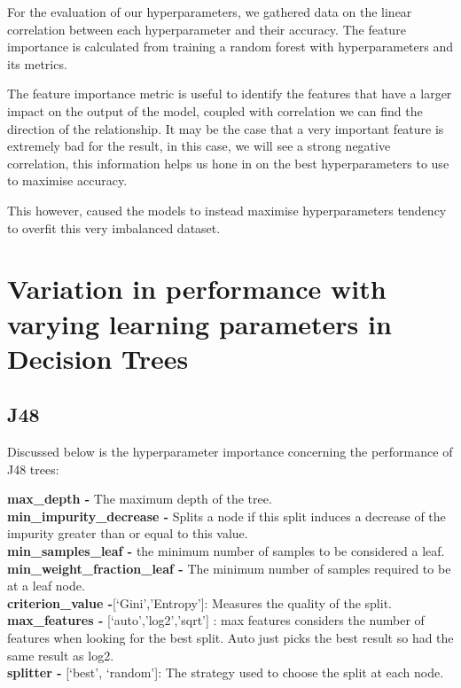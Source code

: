 \documentclass[11pt]{article}
\begin{document}
For the evaluation of our hyperparameters, we gathered data on the linear correlation between each hyperparameter and their accuracy. The feature importance is calculated from training a random forest with hyperparameters and its metrics. \cite{ParameterImportance}
\par
The feature importance metric is useful to identify the features that have a larger impact on the output of the model, coupled with correlation we can find the direction of the relationship. It may be the case that a very important feature is extremely bad for the result, in this case, we will see a strong negative correlation, this information helps us hone in on the best hyperparameters to use to maximise accuracy.
\par
This however, caused the models to instead maximise hyperparameters tendency to overfit this very imbalanced dataset.
\newpage
\section{Variation in performance with varying learning parameters in Decision Trees}

\subsection{J48}

Discussed below is the hyperparameter \cite{SklearnTreeDecisionTreeClassifier} importance concerning the performance of J48 trees:

\textbf{max\_depth -} The maximum depth of the tree. \\
\textbf{min\_impurity\_decrease -} Splits a node if this split induces a decrease of the impurity greater than or equal to this value. \\
\textbf{min\_samples\_leaf -} the minimum number of samples to be considered a leaf. \\
\textbf{min\_weight\_fraction\_leaf -} The minimum number of samples required to be at a leaf node. \\
\textbf{criterion\_value -}[‘Gini’,’Entropy’]: Measures the quality of the split.\\
\textbf{max\_features -} [‘auto’,’log2’,’sqrt’] : max features considers the number of features when looking for the best split. Auto just picks the best result so had the same result as log2. \\
\textbf{splitter -} [‘best’, ‘random’]: The strategy used to choose the split at each node. 
\newline
\end{document}
